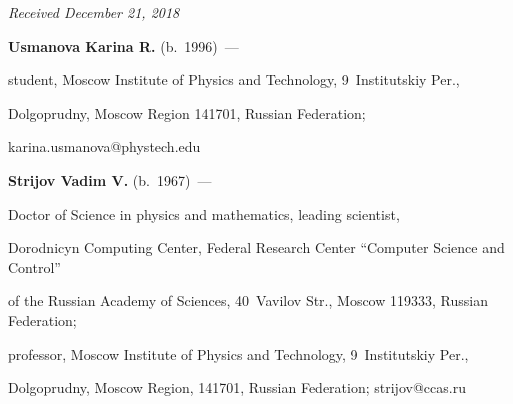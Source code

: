 




\vspace*{-3pt}



\hfill{\small\textit{Received December 21, 2018}} 

  



\Contr



\noindent

\textbf{Usmanova Karina R.} (b.\ 1996)~--- 

student, Moscow Institute of Physics and Technology, 9~Institutskiy Per., 

Dolgoprudny, Moscow Region 141701, Russian Federation; 

\mbox{karina.usmanova@phystech.edu}



\vspace*{3pt}



\noindent

\textbf{Strijov Vadim V.} (b.\ 1967)~--- 

Doctor of Science in physics and mathematics, leading scientist, 

Dorodnicyn Computing Center, Federal Research Center ``Computer Science and Control''

of the Russian Academy of Sciences, 40~Vavilov Str., Moscow 119333, Russian Federation; 

professor, Moscow Institute of Physics and Technology, 9~Institutskiy Per., 

Dolgoprudny, Moscow Region, 141701, Russian Federation; \mbox{strijov@ccas.ru}

\label{end\stat}





\renewcommand{\bibname}{\protect\rm Литература}

